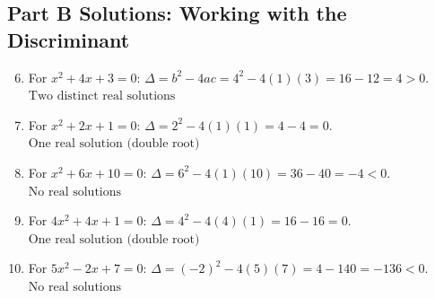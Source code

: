 \documentclass[14pt]{extarticle}
\begin{document}
\subsection*{Part B Solutions: Working with the Discriminant}
\begin{enumerate}
  \setcounter{enumi}{5}
  \item For \(x^2 + 4x + 3 = 0\):  
  \(\Delta = b^2 - 4ac = 4^2 - 4(1)(3) = 16 - 12 = 4 > 0.\)  
  \(\boxed{\text{Two distinct real solutions}}\)

  \item For \(x^2 + 2x + 1 = 0\):  
  \(\Delta = 2^2 - 4(1)(1) = 4 - 4 = 0.\)  
  \(\boxed{\text{One real solution (double root)}}\)

  \item For \(x^2 + 6x + 10 = 0\):  
  \(\Delta = 6^2 - 4(1)(10) = 36 - 40 = -4 < 0.\)  
  \(\boxed{\text{No real solutions}}\)

  \item For \(4x^2 + 4x + 1 = 0\):  
  \(\Delta = 4^2 - 4(4)(1) = 16 - 16 = 0.\)  
  \(\boxed{\text{One real solution (double root)}}\)

  \item For \(5x^2 - 2x + 7 = 0\):  
  \(\Delta = (-2)^2 - 4(5)(7) = 4 - 140 = -136 < 0.\)  
  \(\boxed{\text{No real solutions}}\)
\end{enumerate}
\end{document}
